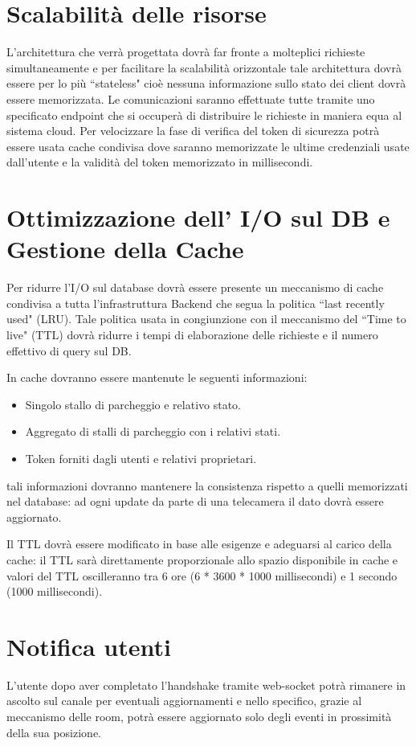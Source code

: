 \section{Scalabilità delle risorse}
L'architettura che verrà progettata dovrà far fronte a molteplici richieste simultaneamente e per facilitare la scalabilità orizzontale tale architettura dovrà essere per lo più ``stateless" cioè nessuna informazione sullo stato dei client dovrà essere memorizzata. Le comunicazioni saranno effettuate tutte tramite uno specificato endpoint che si occuperà di distribuire le richieste in maniera equa al sistema cloud. 
Per velocizzare la fase di verifica del token di sicurezza potrà essere usata cache condivisa dove saranno memorizzate le ultime credenziali usate dall'utente e la validità del token memorizzato in millisecondi. 



\section{Ottimizzazione dell' I/O sul DB e Gestione della Cache}
Per ridurre l'I/O sul database dovrà essere presente un meccanismo di cache condivisa a tutta l'infrastruttura Backend che segua la politica ``last recently used" (LRU). 
Tale politica usata in congiunzione con il meccanismo del ``Time to live" (TTL) dovrà ridurre i tempi di elaborazione delle richieste e il numero effettivo di query sul DB. 

In cache dovranno essere mantenute le seguenti informazioni:

\begin{itemize}
	\item Singolo stallo di parcheggio e relativo stato.
	\item Aggregato di stalli di parcheggio con i relativi stati.
	\item Token forniti dagli utenti e relativi proprietari.
\end{itemize}

tali informazioni dovranno mantenere la consistenza rispetto a quelli memorizzati nel database: ad ogni update da parte di una telecamera il dato dovrà essere aggiornato. 

Il TTL dovrà essere modificato in base alle esigenze e adeguarsi al carico della cache: il TTL sarà direttamente proporzionale allo spazio disponibile in cache e valori del TTL oscilleranno tra 6 ore (6 * 3600 * 1000 millisecondi) e 1 secondo (1000 millisecondi).


\section{Notifica utenti} 
L'utente dopo aver completato l'handshake tramite web-socket potrà rimanere in ascolto sul canale per eventuali aggiornamenti e nello specifico, grazie al meccanismo delle room, potrà essere aggiornato solo degli eventi in prossimità della sua posizione. 
